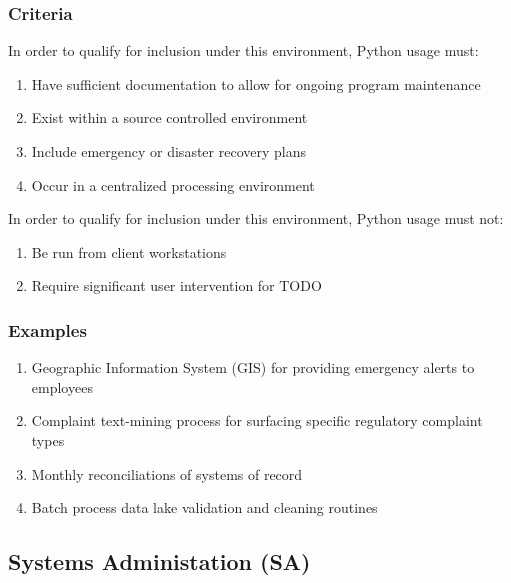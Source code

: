 		\subsubsection{Criteria}

			In order to qualify for inclusion under this environment, Python usage must:

			\begin{enumerate}
                \item Have sufficient documentation to allow for ongoing program maintenance
                \item Exist within a source controlled environment
                \item Include emergency or disaster recovery plans
                \item Occur in a centralized processing environment
        	\end{enumerate}

			In order to qualify for inclusion under this environment, Python usage must not:

			\begin{enumerate}
        		\item Be run from client workstations
                \item Require significant user intervention for TODO
        	\end{enumerate}

		\subsubsection{Examples}

			\begin{enumerate}
        		\item Geographic Information System (GIS) for providing emergency alerts to employees
        		\item Complaint text-mining process for surfacing specific regulatory complaint types
        		\item Monthly reconciliations of systems of record 
        		\item Batch process data lake validation and cleaning routines
        	\end{enumerate}


	\subsection{Systems Administation (SA)}

